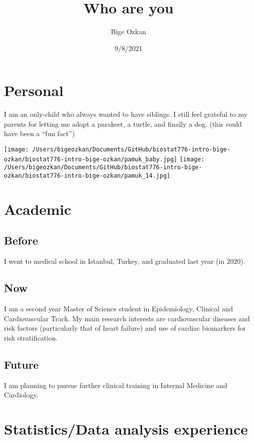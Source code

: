 \documentclass[
]{article}
\title{Who are you}
\author{Bige Ozkan}
\date{9/8/2021}
\begin{document}
\maketitle

\hypertarget{personal}{%
\section{Personal}\label{personal}}

I am an only-child who always wanted to have siblings. I still feel
grateful to my parents for letting me adopt a parakeet, a turtle, and
finally a dog. (this could have been a ``fun fact'')

\texttt{[image: /Users/bigeozkan/Documents/GitHub/biostat776-intro-bige-ozkan/biostat776-intro-bige-ozkan/pamuk\_baby.jpg]}
\texttt{[image: /Users/bigeozkan/Documents/GitHub/biostat776-intro-bige-ozkan/biostat776-intro-bige-ozkan/pamuk\_14.jpg]}

\hypertarget{academic}{%
\section{Academic}\label{academic}}

\hypertarget{before}{%
\subsection{Before}\label{before}}

I went to medical school in Istanbul, Turkey, and graduated last year
(in 2020).

\hypertarget{now}{%
\subsection{Now}\label{now}}

I am a second year Master of Science student in Epidemiology, Clinical
and Cardiovascular Track. My main research interests are cardiovascular
diseases and risk factors (particularly that of heart failure) and use
of cardiac biomarkers for risk stratification.

\hypertarget{future}{%
\subsection{Future}\label{future}}

I am planning to pursue further clinical training in Internal Medicine
and Cardiology.

\hypertarget{statisticsdata-analysis-experience}{%
\section{Statistics/Data analysis
experience}\label{statisticsdata-analysis-experience}}
\end{document}
